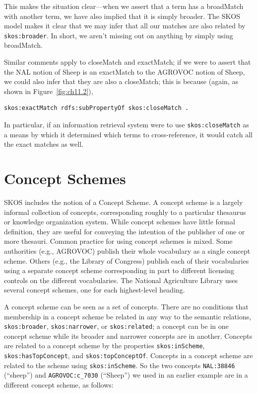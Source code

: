 This makes the situation clear---when we assert that a term has a
broadMatch with another term, we have also implied that it is simply
broader. The SKOS model makes it clear that we may infer that all our
matches are also related by \texttt{skos:broader}. In short, we aren't missing
out on anything by simply using broadMatch.

Similar comments apply to closeMatch and exactMatch; if we were to
assert that the NAL
notion of Sheep is an exactMatch to the AGROVOC notion of Sheep, we
could also infer that they are also a closeMatch; this is because
(again, as shown in Figure~\ref{fig:ch11.2}),

\begin{lstlisting}
skos:exactMatch rdfs:subPropertyOf skos:closeMatch .
\end{lstlisting}

In particular, if an information retrieval system were to use
\texttt{skos:closeMatch} as a means by which it determined which terms to
cross-reference, it would catch all the exact matches as well.

\section{Concept Schemes}

SKOS includes the notion of a Concept Scheme. A concept scheme is a
largely informal collection of concepts, corresponding roughly to a
particular thesaurus or knowledge organization system. While concept
schemes have little formal definition, they are useful for conveying the
intention of the publisher of one or more thesauri. Common practice for
using concept schemes is mixed. Some authorities (e.g., AGROVOC) publish
their whole vocabulary as a single concept scheme. Others (e.g., the
Library of Congress) publish each of their vocabularies using a separate
concept scheme
corresponding in part to different licensing controls on the different
vocabularies. The National
Agriculture Library uses several concept schemes, one for each
highest-level heading.

A concept scheme can be seen as a set of concepts. There are no
conditions that membership in a concept scheme be related in any way to
the semantic relations, \texttt{skos:broader}, \texttt{skos:narrower}, or \texttt{skos:related}; a
concept can be in one concept scheme while its broader and narrower
concepts are in another. Concepts are related to a concept scheme by the
properties \texttt{skos:inScheme}, \texttt{skos:hasTopConcept}, and \texttt{skos:topConceptOf}.
Concepts in a concept scheme are related to the scheme using
\texttt{skos:inScheme}. So the two
concepts \texttt{NAL:38846} (``sheep'') and \texttt{AGROVOC:c\_7030} (``Sheep'') we used
in an earlier example are in a different concept scheme, as follows:


